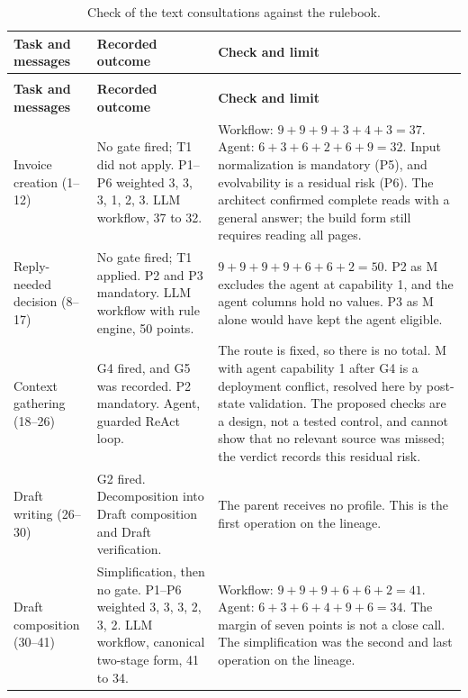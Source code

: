 \begingroup
\renewcommand{\baselinestretch}{1}\small
\setlength{\tabcolsep}{3pt}\renewcommand{\arraystretch}{1.08}
\begin{longtable}{>{\raggedright\arraybackslash}p{} >{\raggedright\arraybackslash}p{} >{\raggedright\arraybackslash}p{}}
\caption[Check of the text consultations against the rulebook]{Check of the text consultations against the rulebook.}\label{tab:demo-audit}\\
\toprule
\textbf{Task and messages} & \textbf{Recorded outcome} & \textbf{Check and limit} \\
\midrule
\endfirsthead
\multicolumn{3}{l}{\tablename~\thetable{} (continued)}\\
\toprule
\textbf{Task and messages} & \textbf{Recorded outcome} & \textbf{Check and limit}\\
\midrule
\endhead
\bottomrule
\endlastfoot
Invoice creation (1--12) & No gate fired; T1 did not apply. P1--P6 weighted 3, 3, 3, 1, 2, 3. LLM workflow, 37 to 32. & Workflow: $9+9+9+3+4+3=37$. Agent: $6+3+6+2+6+9=32$. Input normalization is mandatory (P5), and evolvability is a residual risk (P6). The architect confirmed complete reads with a general answer; the build form still requires reading all pages. \\
\addlinespace
Reply-needed decision (8--17) & No gate fired; T1 applied. P2 and P3 mandatory. LLM workflow with rule engine, 50 points. & $9+9+9+9+6+6+2=50$. P2 as M excludes the agent at capability 1, and the agent columns hold no values. P3 as M alone would have kept the agent eligible. \\
\addlinespace
Context gathering (18--26) & G4 fired, and G5 was recorded. P2 mandatory. Agent, guarded ReAct loop. & The route is fixed, so there is no total. M with agent capability 1 after G4 is a deployment conflict, resolved here by post-state validation. The proposed checks are a design, not a tested control, and cannot show that no relevant source was missed; the verdict records this residual risk. \\
\addlinespace
Draft writing (26--30) & G2 fired. Decomposition into Draft composition and Draft verification. & The parent receives no profile. This is the first operation on the lineage. \\
\addlinespace
Draft composition (30--41) & Simplification, then no gate. P1--P6 weighted 3, 3, 3, 2, 3, 2. LLM workflow, canonical two-stage form, 41 to 34. & Workflow: $9+9+9+6+6+2=41$. Agent: $6+3+6+4+9+6=34$. The margin of seven points is not a close call. The simplification was the second and last operation on the lineage. \\

\end{longtable}
